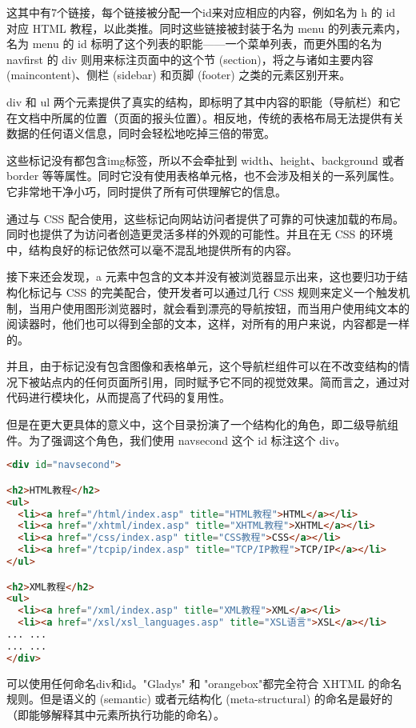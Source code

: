 这其中有7个链接，每个链接被分配一个id来对应相应的内容，例如名为 h 的 id 对应 HTML 教程，以此类推。同时这些链接被封装于名为 menu 的列表元素内，名为 menu 的 id 标明了这个列表的职能——一个菜单列表，而更外围的名为 navfirst 的 div 则用来标注页面中的这个节 (section)，将之与诸如主要内容 (maincontent)、侧栏 (sidebar) 和页脚 (footer) 之类的元素区别开来。

div 和 ul 两个元素提供了真实的结构，即标明了其中内容的职能（导航栏）和它在文档中所属的位置（页面的报头位置）。相反地，传统的表格布局无法提供有关数据的任何语义信息，同时会轻松地吃掉三倍的带宽。


这些标记没有都包含img标签，所以不会牵扯到 width、height、background 或者 border 等等属性。同时它没有使用表格单元格，也不会涉及相关的一系列属性。它非常地干净小巧，同时提供了所有可供理解它的信息。

通过与 CSS 配合使用，这些标记向网站访问者提供了可靠的可快速加载的布局。同时也提供了为访问者创造更灵活多样的外观的可能性。并且在无 CSS 的环境中，结构良好的标记依然可以毫不混乱地提供所有的内容。

接下来还会发现，a 元素中包含的文本并没有被浏览器显示出来，这也要归功于结构化标记与 CSS 的完美配合，使开发者可以通过几行 CSS 规则来定义一个触发机制，当用户使用图形浏览器时，就会看到漂亮的导航按钮，而当用户使用纯文本的阅读器时，他们也可以得到全部的文本，这样，对所有的用户来说，内容都是一样的。

并且，由于标记没有包含图像和表格单元，这个导航栏组件可以在不改变结构的情况下被站点内的任何页面所引用，同时赋予它不同的视觉效果。简而言之，通过对代码进行模块化，从而提高了代码的复用性。

但是在更大更具体的意义中，这个目录扮演了一个结构化的角色，即二级导航组件。为了强调这个角色，我们使用 navsecond 这个 id 标注这个 div。

\begin{lstlisting}[language=HTML]
<div id="navsecond">

<h2>HTML教程</h2>
<ul>
  <li><a href="/html/index.asp" title="HTML教程">HTML</a></li>
  <li><a href="/xhtml/index.asp" title="XHTML教程">XHTML</a></li>
  <li><a href="/css/index.asp" title="CSS教程">CSS</a></li>
  <li><a href="/tcpip/index.asp" title="TCP/IP教程">TCP/IP</a></li>
</ul>

<h2>XML教程</h2>
<ul>
  <li><a href="/xml/index.asp" title="XML教程">XML</a></li>
  <li><a href="/xsl/xsl_languages.asp" title="XSL语言">XSL</a></li>
... ...
... ...
</div>
\end{lstlisting}

可以使用任何命名div和id。"Gladys" 和 "orangebox"都完全符合 XHTML 的命名规则。但是语义的 (semantic) 或者元结构化 (meta-structural) 的命名是最好的（即能够解释其中元素所执行功能的命名）。

